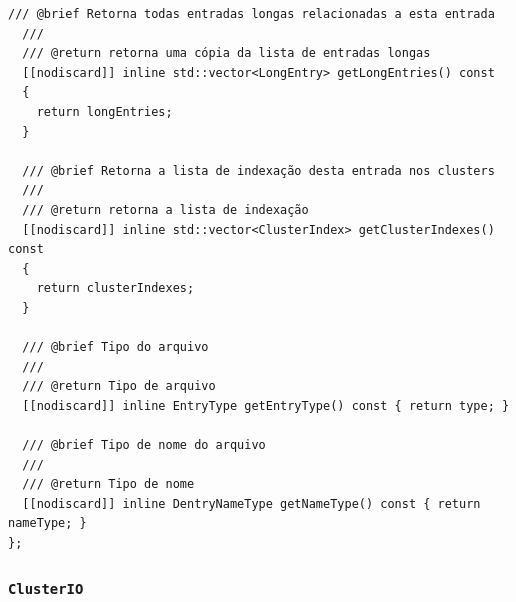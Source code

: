 \documentclass[
    12pt,				%
    oneside,   	        %
    a4paper,			%
    english,			%
    french,				%
    spanish,			%
    brazil,				%
    ]{pacotes/abntex2}
\begin{document}
\begin{lstlisting}[caption={Classe que abstrai entradas longas e curtas em uma única interface}, label={lst:dentry}]
  /// @brief Retorna todas entradas longas relacionadas a esta entrada
  ///
  /// @return retorna uma cópia da lista de entradas longas
  [[nodiscard]] inline std::vector<LongEntry> getLongEntries() const
  {
    return longEntries;
  }

  /// @brief Retorna a lista de indexação desta entrada nos clusters
  ///
  /// @return retorna a lista de indexação
  [[nodiscard]] inline std::vector<ClusterIndex> getClusterIndexes() const
  {
    return clusterIndexes;
  }

  /// @brief Tipo do arquivo
  ///
  /// @return Tipo de arquivo
  [[nodiscard]] inline EntryType getEntryType() const { return type; }

  /// @brief Tipo de nome do arquivo
  ///
  /// @return Tipo de nome
  [[nodiscard]] inline DentryNameType getNameType() const { return nameType; }
};
\end{lstlisting}

\subsubsection{\texttt{ClusterIO}}
\label{subsubsec:cluster_io}
\end{document}

